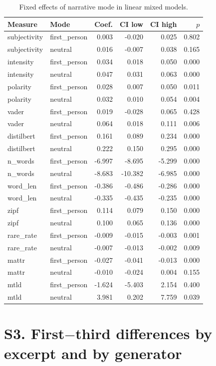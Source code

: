 \documentclass[10pt]{article}
\begin{document}
{\scriptsize
\begin{longtable}{llrrrr}
\caption{Fixed effects of narrative mode in linear mixed models.}\\
\toprule
Measure & Mode & Coef. & CI low & CI high & $p$ \\
\midrule
\endhead
subjectivity & first\_person & 0.003 & -0.020 & 0.025 & 0.802 \\
subjectivity & neutral & 0.016 & -0.007 & 0.038 & 0.165 \\
intensity & first\_person & 0.034 & 0.018 & 0.050 & 0.000 \\
intensity & neutral & 0.047 & 0.031 & 0.063 & 0.000 \\
polarity & first\_person & 0.028 & 0.007 & 0.050 & 0.011 \\
polarity & neutral & 0.032 & 0.010 & 0.054 & 0.004 \\
vader & first\_person & 0.019 & -0.028 & 0.065 & 0.428 \\
vader & neutral & 0.064 & 0.018 & 0.111 & 0.006 \\
distilbert & first\_person & 0.161 & 0.089 & 0.234 & 0.000 \\
distilbert & neutral & 0.222 & 0.150 & 0.295 & 0.000 \\
n\_words & first\_person & -6.997 & -8.695 & -5.299 & 0.000 \\
n\_words & neutral & -8.683 & -10.382 & -6.985 & 0.000 \\
word\_len & first\_person & -0.386 & -0.486 & -0.286 & 0.000 \\
word\_len & neutral & -0.335 & -0.435 & -0.235 & 0.000 \\
zipf & first\_person & 0.114 & 0.079 & 0.150 & 0.000 \\
zipf & neutral & 0.100 & 0.065 & 0.136 & 0.000 \\
rare\_rate & first\_person & -0.009 & -0.015 & -0.003 & 0.001 \\
rare\_rate & neutral & -0.007 & -0.013 & -0.002 & 0.009 \\
mattr & first\_person & -0.027 & -0.041 & -0.013 & 0.000 \\
mattr & neutral & -0.010 & -0.024 & 0.004 & 0.155 \\
mtld & first\_person & -1.624 & -5.403 & 2.154 & 0.400 \\
mtld & neutral & 3.981 & 0.202 & 7.759 & 0.039 \\
\bottomrule
\end{longtable}
}


\section*{S3. First$-$third differences by excerpt and by generator}
\end{document}
